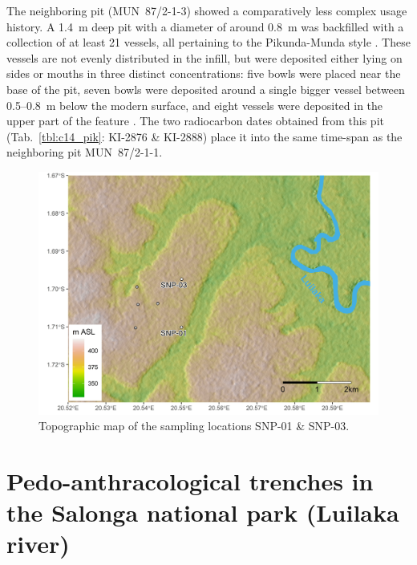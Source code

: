 \documentclass[a4paper]{article}
\begin{document}
The neighboring pit (MUN~87/2-1-3) showed a comparatively less complex usage history. A 1.4~m deep pit with a diameter of around 0.8~m was backfilled with a collection of at least 21 vessels, all pertaining to the Pikunda-Munda style \cite[Fig.\ref{fig:mun.pottery}.7--10;][114--120; 330--335]{Seidensticker.2021e}. These vessels are not evenly distributed in the infill, but were deposited either lying on sides or mouths in three distinct concentrations: five bowls were placed near the base of the pit, seven bowls were deposited around a single bigger vessel between 0.5--0.8~m below the modern surface, and eight vessels were deposited in the upper part of the feature \cite[331 Fig.~164]{Seidensticker.2021e}. The two radiocarbon dates obtained from this pit (Tab.~\ref{tbl:c14_pik}: KI-2876 \& KI-2888) place it into the same time-span as the neighboring pit MUN~87/2-1-1.

\begin{figure}[!tb]
	\includegraphics[width=\textwidth]{Fig_Terrain_SNP.jpg}
	\caption{Topographic map of the sampling locations SNP-01 \& SNP-03.}
	\label{fig:snp.map}
\end{figure}

\section{Pedo-anthracological trenches in the Salonga national park (Luilaka river)}
\end{document}

